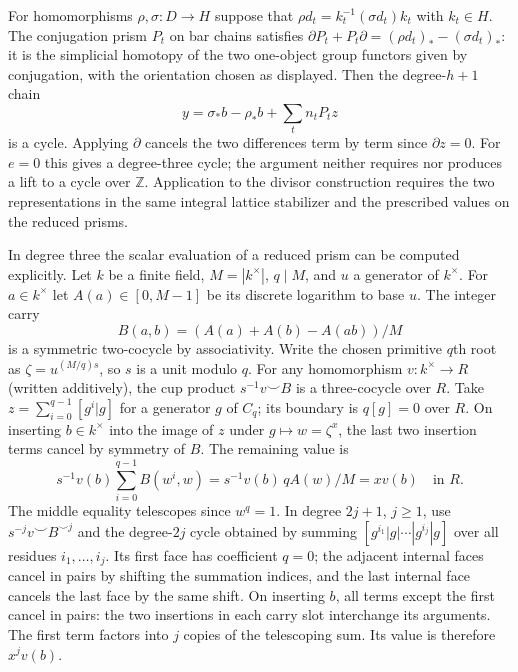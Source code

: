 \documentclass[11pt]{amsart}
\theoremstyle{definition}
\theoremstyle{remark}
\begin{document}
For homomorphisms $\rho,\sigma:D\to H$ suppose that
$\rho d_t=k_t^{-1}(\sigma d_t)k_t$ with $k_t\in H$.
The conjugation prism $P_t$ on bar chains satisfies
$\partial P_t+P_t\partial=(\rho d_t)_*-(\sigma d_t)_*$:
it is the simplicial homotopy of the two one-object group functors
given by conjugation, with the orientation chosen as displayed.
Then the degree-$h+1$ chain
\[
 y=\sigma_*b-\rho_*b+\sum_t n_t P_tz
\]
is a cycle. Applying $\partial$ cancels the two differences term by
term since $\partial z=0$. For $e=0$ this gives a degree-three cycle;
the argument neither requires nor produces a lift to a cycle over
$\mathbb Z$. Application to the divisor construction requires the two
representations in the same integral lattice stabilizer and the
prescribed values on the reduced prisms.

In degree three the scalar evaluation of a reduced prism can be
computed explicitly. Let $k$ be a finite field, $M=|k^\times|$,
$q\mid M$, and $u$ a generator of $k^\times$. For $a\in k^\times$
let $A(a)\in[0,M-1]$ be its discrete logarithm to base $u$. The
integer carry
\[
 B(a,b)=(A(a)+A(b)-A(ab))/M
\]
is a symmetric two-cocycle by associativity. Write the chosen
primitive $q$th root as $\zeta=u^{(M/q)s}$, so $s$ is a unit modulo
$q$. For any homomorphism $v:k^\times\to R$ (written additively),
the cup product $s^{-1}v\smile B$ is a three-cocycle over $R$.
Take $z=\sum_{i=0}^{q-1}[g^i|g]$ for a generator $g$ of $C_q$;
its boundary is $q[g]=0$ over $R$. On inserting $b\in k^\times$
into the image of $z$ under $g\mapsto w=\zeta^x$, the last two
insertion terms cancel by symmetry of $B$. The remaining value is
\[
 s^{-1}v(b)\sum_{i=0}^{q-1} B(w^i,w)
   =s^{-1}v(b)\,q A(w)/M=xv(b)\quad\text{in }R.
\]
The middle equality telescopes since $w^q=1$. In degree $2j+1$,
$j\ge1$, use $s^{-j}v\smile B^{\smile j}$ and the degree-$2j$
cycle obtained by summing
$[g^{i_1}|g|\cdots|g^{i_j}|g]$ over all residues $i_1,\dots,i_j$.
Its first face has coefficient $q=0$; the adjacent internal faces
cancel in pairs by shifting the summation indices, and the last
internal face cancels the last face by the same shift.
On inserting $b$, all terms except the first cancel in pairs:
the two insertions in each carry slot interchange its arguments.
The first term factors into $j$ copies of the telescoping sum.
Its value is therefore $x^jv(b)$.
\end{document}
